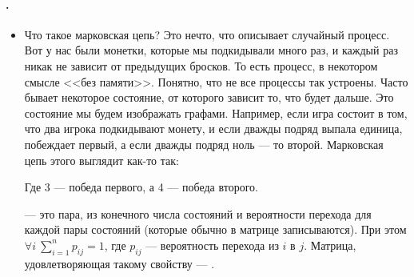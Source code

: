 \documentclass{article}
\begin{document}
    \paragraph{.}
    \begin{itemize}
        \item[]
        \begin{Comment}
            Что такое марковская цепь? Это нечто, что описывает случайный процесс. Вот у нас были монетки, которые мы подкидывали много раз, и каждый раз никак не зависит от предыдущих бросков. То есть процесс, в некотором смысле <<без памяти>>. Понятно, что не все процессы так устроены. Часто бывает некоторое состояние, от которого зависит то, что будет дальше. Это состояние мы будем изображать графами. Например, если игра состоит в том, что два игрока подкидывают монету, и если дважды подряд выпала единица, побеждает первый, а если дважды подряд ноль --- то второй. Марковская цепь этого выглядит как-то так:
            \begin{center}
            \end{center}
            Где 3 --- победа первого, а 4 --- победа второго.
        \end{Comment}
        \dfn {} --- это пара, из конечного числа состояний и вероятности перехода для каждой пары состояний (которые обычно в матрице записываются). При этом $\forall i~\sum\limits_{i=1}^n p_{ij}=1$, где $p_{ij}$ --- вероятность перехода из $i$ в $j$. Матрица, удовлетворяющая такому свойству --- .

\end{itemize}
\end{document}
